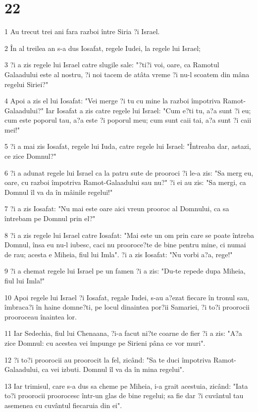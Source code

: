 \chapter{22}

\par 1 Au trecut trei ani fara razboi între Siria ?i Israel.
\par 2 În al treilea an s-a dus Iosafat, regele Iudei, la regele lui Israel;
\par 3 ?i a zis regele lui Israel catre slugile sale: "?ti?i voi, oare, ca Ramotul Galaadului este al nostru, ?i noi tacem de atâta vreme ?i nu-l scoatem din mâna regelui Siriei?"
\par 4 Apoi a zis el lui Iosafat: "Vei merge ?i tu cu mine la razboi împotriva Ramot-Galaadului?" Iar Iosafat a zis catre regele lui Israel: "Cum e?ti tu, a?a sunt ?i eu; cum este poporul tau, a?a este ?i poporul meu; cum sunt caii tai, a?a sunt ?i caii mei!"
\par 5 ?i a mai zis Iosafat, regele lui Iuda, catre regele lui Israel: "Întreaba dar, astazi, ce zice Domnul?"
\par 6 ?i a adunat regele lui Israel ca la patru sute de prooroci ?i le-a zis: "Sa merg eu, oare, cu razboi împotriva Ramot-Galaadului sau nu?" ?i ei au zis: "Sa mergi, ca Domnul îl va da în mâinile regelui!"
\par 7 ?i a zis Iosafat: "Nu mai este oare aici vreun prooroc al Domnului, ca sa întrebam pe Domnul prin el?"
\par 8 ?i a zis regele lui Israel catre Iosafat: "Mai este un om prin care se poate întreba Domnul, însa eu nu-l iubesc, caci nu prooroce?te de bine pentru mine, ci numai de rau; acesta e Miheia, fiul lui Imla". ?i a zis Iosafat: "Nu vorbi a?a, rege!"
\par 9 ?i a chemat regele lui Israel pe un famen ?i a zis: "Du-te repede dupa Miheia, fiul lui Imla!"
\par 10 Apoi regele lui Israel ?i Iosafat, regale Iudei, s-au a?ezat fiecare în tronul sau, îmbraca?i în haine domne?ti, pe locul dinaintea por?ii Samariei, ?i to?i proorocii prooroceau înaintea lor.
\par 11 Iar Sedechia, fiul lui Chenaana, ?i-a facut ni?te coarne de fier ?i a zis: "A?a zice Domnul: cu acestea vei împunge pe Sirieni pâna ce vor muri".
\par 12 ?i to?i proorocii au proorocit la fel, zicând: "Sa te duci împotriva Ramot-Galaadului, ca vei izbuti. Domnul îl va da în mina regelui".
\par 13 Iar trimisul, care s-a dus sa cheme pe Miheia, i-a grait acestuia, zicând: "Iata to?i proorocii proorocesc într-un glas de bine regelui; sa fie dar ?i cuvântul tau asemenea cu cuvântul fiecaruia din ei".
